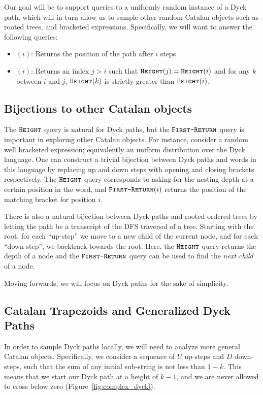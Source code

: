 Our goal will be to support queries to a uniformly random instance of a Dyck path,
which will in turn allow us to sample other random Catalan objects such as rooted trees, and bracketed expressions.
Specifically, we will want to answer the following queries:
\begin{itemize}
    \item {}$(i)$: Returns the position of the path after $i$ steps
    \item {}$(i)$: Returns an index $j>i$ such that $\texttt{\textsc{Height}}(j)=\texttt{\textsc{Height}}(i)$ and for any $k$ between $i$ and $j$,
    $\texttt{\textsc{Height}}(k)$ is strictly greater than $\texttt{\textsc{Height}}(i)$.
\end{itemize}



\subsection{Bijections to other Catalan objects}%
\label{sec:bijections_to_other_catalan_objects}
The $\texttt{\textsc{Height}}$ query is natural for Dyck paths, but the $\texttt{\textsc{First-Return}}$ query is important in exploring other Catalan objects.
For instance, consider a random well bracketed expression; equivalently an uniform distribution over the Dyck language.
One can construct a trivial bijection between Dyck paths and words in this language
by replacing up and down steps with opening and closing brackets respectively.
The $\texttt{\textsc{Height}}$ query corresponds to asking for the nesting depth at a certain position in the word,
and $\texttt{\textsc{First-Return}}(i)$ returns the position of the matching bracket for position $i$.

There is also a natural bijection between Dyck paths and rooted ordered trees by letting the path be a transcript of the DFS traversal of a tree.
Starting with the root, for each ``up-step'' we move to a new child of the current node, and for each ``down-step'', we backtrack towards the root.
Here, the $\texttt{\textsc{Height}}$ query returns the depth of a node and the $\texttt{\textsc{First-Return}}$ query can be used to find the \emph{next child} of a node.

Moving forwards, we will focus on Dyck paths for the sake of simplicity.



\subsection{Catalan Trapezoids and Generalized Dyck Paths}
In order to sample Dyck paths locally, we will need to analyze more general Catalan objects.
Specifically, we consider a sequence of $U$ up-steps and $D$ down-steps, such that the sum of any initial sub-string is not less than $1-k$.
This means that we start our Dyck path at a height of $k-1$, and we are never allowed to cross below zero (Figure~\ref{fig:complex_dyck}).

